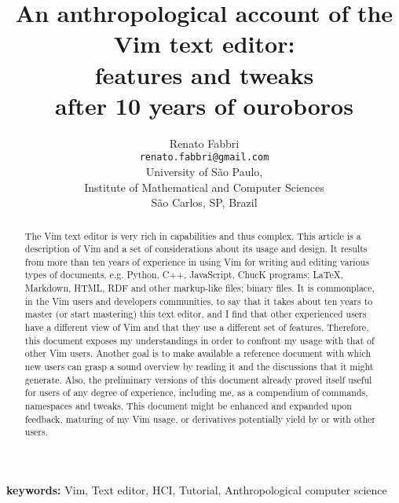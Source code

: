 \documentclass{article}
\begin{document}
\title{An anthropological account of the\\ Vim text editor:\\
features and tweaks\\ after 10 years of ouroboros}
\author{Renato Fabbri\\
\texttt{renato.fabbri@gmail.com}\\
University of São Paulo,\\
Institute of Mathematical and Computer Sciences\\
São Carlos, SP, Brazil
}
\maketitle
\begin{abstract}
The Vim text editor is very rich in capabilities
and thus complex.
This article is a description of Vim
and a set of considerations about its usage and design.
It results from more than ten years of experience
in using Vim for writing and editing various types of documents,
e.g. Python, C++, JavaScript, ChucK programs;
\LaTeX, Markdown, HTML, RDF and other markup-like files;  %
binary files.
It is commonplace, in the Vim users and developers communities,
to say that it takes about ten years to master (or start mastering)
this text editor, and I find that other experienced users
have a different view of Vim and that they use a different
set of features.
Therefore, this document exposes my understandings in order
to confront my usage with that of other Vim users.
Another goal is
to make available a reference document with which new users
can grasp a sound overview by reading it and the discussions that
it might generate.
Also, the preliminary versions of this document already proved itself
useful for users of any degree of experience,
including me, as a compendium of commands, namespaces and tweaks.
This document might be enhanced and expanded
upon feedback, maturing of my Vim usage, or derivatives potentially
yield by or with other users.
\end{abstract}
{\bf keywords:} Vim, Text editor, HCI, Tutorial, Anthropological computer science
\end{document}
